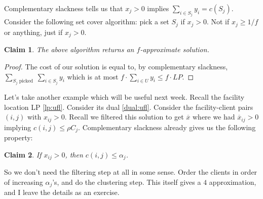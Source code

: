 \documentclass[11pt]{article}
\newtheorem{claim}{Claim}
\def\bar{\overline}
\begin{document}
Complementary slackness tells us that $x_j > 0$ implies $\sum_{i\in S_j} y_i = c(S_j)$. Consider the following set cover algorithm: pick a set $S_j$ if $x_j > 0$. Not if $x_j \ge 1/f$ or anything, just if $x_j > 0$. 
\begin{claim}
The above algorithm returns an $f$-approximate solution.
\end{claim}
\begin{proof}
The cost of our solution is equal to, by complementary slackness, $\sum_{S_j \textrm{ picked }} \sum_{i\in S_j} y_i$ which is at most $f\cdot \sum_{i\in U} y_i \le f \cdot LP$.
\end{proof}

Let's take another example which will be useful next week. Recall the facility location LP \eqref{lp:ufl}. Consider its dual \eqref{dual:ufl}. Consider the facility-client pairs $(i,j)$ with $x_{ij} > 0$. Recall we 
filtered this solution to get $\bar{x}$ where we had $\bar{x}_{ij} > 0$ implying $c(i,j) \le \rho C_j$. Complementary slackness already gives us the following property:

\begin{claim}
If $x_{ij} > 0$, then $c(i,j) \le \alpha_j$.
\end{claim}

So we don't need the filtering step at all in some sense. Order the clients in order of increasing $\alpha_j$'s, and do the clustering step. This itself gives a $4$ approximation, and I leave the details as an exercise.




\end{document}

